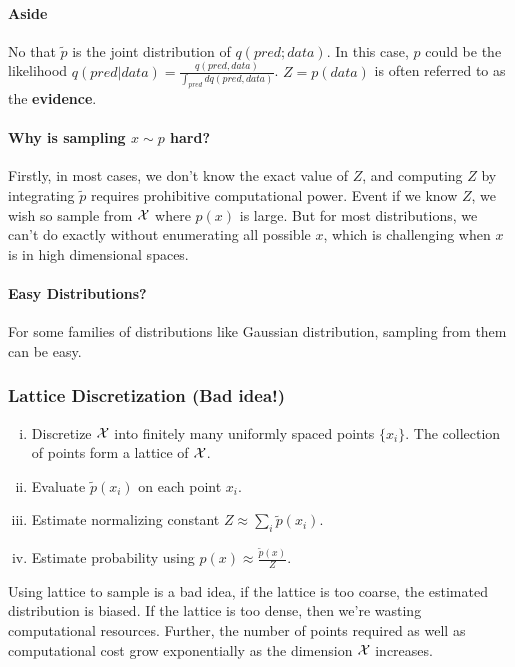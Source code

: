 \documentclass{article}
\begin{document}
	\paragraph{Aside} No that $\tilde{p}$ is the joint distribution of $q(pred; data)$. In this case, $p$ could be the likelihood $q(pred|data) = \frac{q(pred, data)}{\int_{pred}dq(pred, data)}$. $Z = p(data)$ is often referred to as the \textbf{evidence}.

	\paragraph{Why is sampling $x \sim p$ hard?} Firstly, in most cases, we don't know the exact value of $Z$, and computing $Z$ by integrating $\tilde{p}$ requires prohibitive computational power. Event if we know $Z$, we wish so sample from $\mathcal{{X}}$ where $p(x)$ is large. But for most distributions, we can't do exactly without enumerating all possible $x$, which is challenging when $x$ is in high dimensional spaces.
	
	\paragraph{Easy Distributions?} For some families of distributions like Gaussian distribution, sampling from them can be easy.
	
	\subsubsection{Lattice Discretization (Bad idea!)}
	\begin{algorithm}\quad
		\begin{enumerate}[(i)]
			\item Discretize $\mathcal{{X}}$ into finitely many uniformly spaced points $\{x_i\}$. The collection of points form a lattice of $\mathcal{{X}}$.
			\item Evaluate $\tilde{p}(x_i)$ on each point $x_i$.
			\item Estimate normalizing constant $Z \approx \sum_i \tilde{p}(x_i)$.
			\item Estimate probability using $p(x) \approx \frac{\tilde{p}(x)}{Z}$. 
		\end{enumerate}
	\end{algorithm}
	
	\par Using lattice to sample is a bad idea, if the lattice is too coarse, the estimated distribution is biased. If the lattice is too dense, then we're wasting computational resources. Further, the number of points required as well as computational cost grow exponentially as the dimension $\mathcal{{X}}$ increases.
	
\end{document}
